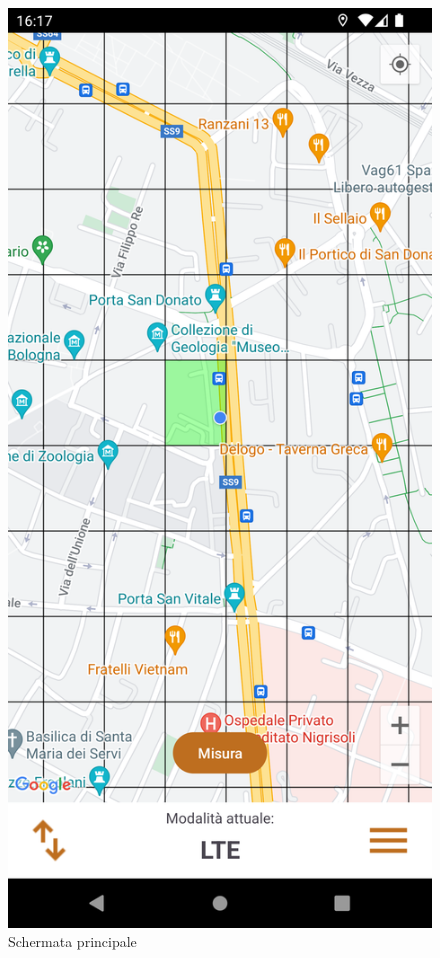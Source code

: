 \documentclass[11pt]{article}
\begin{document}
\begin{minipage}[t]{0.35\textwidth}
    \begin{figure}[H]
        \centering
        \vspace*{-0.7cm}
        \includegraphics[width=\textwidth]{img/mainActivity.png}
        \caption{Schermata principale}
        \label{fig:mainActivity}
    \end{figure}
\end{minipage}
\end{document}
